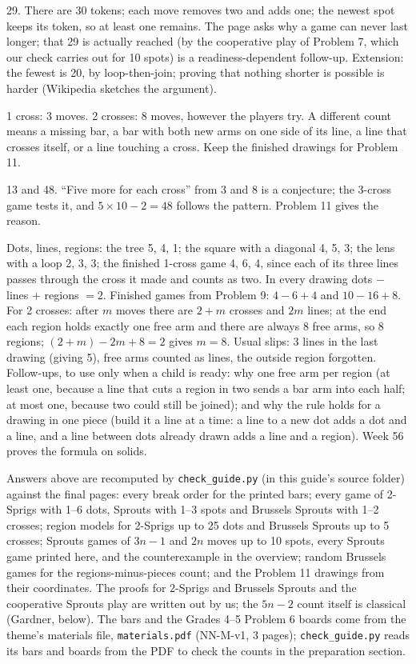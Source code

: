 29. There are 30 tokens; each move removes two and adds one; the newest spot keeps its token, so at least one remains. The page asks why a game can never last longer; that 29 is actually reached (by the cooperative play of Problem 7, which our check carries out for 10 spots) is a readiness-dependent follow-up. Extension: the fewest is 20, by loop-then-join; proving that nothing shorter is possible is harder (Wikipedia sketches the argument).

1 cross: 3 moves. 2 crosses: 8 moves, however the players try. A different count means a missing bar, a bar with both new arms on one side of its line, a line that crosses itself, or a line touching a cross. Keep the finished drawings for Problem 11.

13 and 48. ``Five more for each cross'' from 3 and 8 is a conjecture; the 3-cross game tests it, and $5\times10-2=48$ follows the pattern. Problem 11 gives the reason.

Dots, lines, regions: the tree 5, 4, 1; the square with a diagonal 4, 5, 3; the lens with a loop 2, 3, 3; the finished 1-cross game 4, 6, 4, since each of its three lines passes through the cross it made and counts as two. In every drawing dots $-$ lines $+$ regions $=2$. Finished games from Problem 9: $4-6+4$ and $10-16+8$. For 2 crosses: after $m$ moves there are $2+m$ crosses and $2m$ lines; at the end each region holds exactly one free arm and there are always 8 free arms, so 8 regions; $(2+m)-2m+8=2$ gives $m=8$. Usual slips: 3 lines in the last drawing (giving 5), free arms counted as lines, the outside region forgotten. Follow-ups, to use only when a child is ready: why one free arm per region (at least one, because a line that cuts a region in two sends a bar arm into each half; at most one, because two could still be joined); and why the rule holds for a drawing in one piece (build it a line at a time: a line to a new dot adds a dot and a line, and a line between dots already drawn adds a line and a region). Week 56 proves the formula on solids.

Answers above are recomputed by \texttt{check\_guide.py} (in this guide's source folder) against the final pages: every break order for the printed bars; every game of 2-Sprigs with 1--6 dots, Sprouts with 1--3 spots and Brussels Sprouts with 1--2 crosses; region models for 2-Sprigs up to 25 dots and Brussels Sprouts up to 5 crosses; Sprouts games of $3n-1$ and $2n$ moves up to 10 spots, every Sprouts game printed here, and the counterexample in the overview; random Brussels games for the regions-minus-pieces count; and the Problem 11 drawings from their coordinates. The proofs for 2-Sprigs and Brussels Sprouts and the cooperative Sprouts play are written out by us; the $5n-2$ count itself is classical (Gardner, below). The bars and the Grades 4--5 Problem 6 boards come from the theme's materials file, \texttt{materials.pdf} (NN-M-v1, 3 pages); \texttt{check\_guide.py} reads its bars and boards from the PDF to check the counts in the preparation section.

